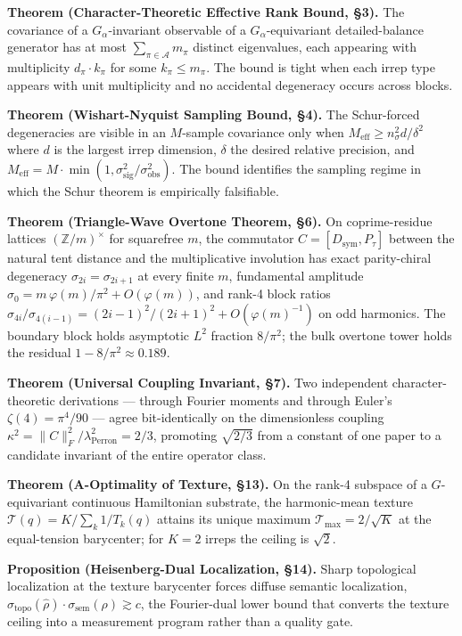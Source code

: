 \documentclass[
  11pt,
]{article}
\begin{document}
\textbf{Theorem (Character-Theoretic Effective Rank Bound, §3).} The
covariance of a \(G_\alpha\)-invariant observable of a
\(G_\alpha\)-equivariant detailed-balance generator has at most
\(\sum_{\pi \in \mathcal{A}} m_\pi\) distinct eigenvalues, each
appearing with multiplicity \(d_\pi \cdot k_\pi\) for some
\(k_\pi \leq m_\pi\). The bound is tight when each irrep type appears
with unit multiplicity and no accidental degeneracy occurs across
blocks.

\textbf{Theorem (Wishart-Nyquist Sampling Bound, §4).} The Schur-forced
degeneracies are visible in an \(M\)-sample covariance only when
\(M_\text{eff} \geq n_\sigma^2 d / \delta^2\) where \(d\) is the largest
irrep dimension, \(\delta\) the desired relative precision, and
\(M_\text{eff} = M \cdot \min(1, \sigma_\text{sig}^2/\sigma_\text{obs}^2)\).
The bound identifies the sampling regime in which the Schur theorem is
empirically falsifiable.

\textbf{Theorem (Triangle-Wave Overtone Theorem, §6).} On
coprime-residue lattices \((\mathbb{Z}/m)^\times\) for squarefree \(m\),
the commutator \(C = [D_\text{sym}, P_\tau]\) between the natural tent
distance and the multiplicative involution has exact parity-chiral
degeneracy \(\sigma_{2i} = \sigma_{2i+1}\) at every finite \(m\),
fundamental amplitude
\(\sigma_0 = m\,\varphi(m)/\pi^2 + O(\varphi(m))\), and rank-4 block
ratios
\(\sigma_{4i}/\sigma_{4(i-1)} = (2i-1)^2/(2i+1)^2 + O(\varphi(m)^{-1})\)
on odd harmonics. The boundary block holds asymptotic \(L^2\) fraction
\(8/\pi^2\); the bulk overtone tower holds the residual
\(1 - 8/\pi^2 \approx 0.189\).

\textbf{Theorem (Universal Coupling Invariant, §7).} Two independent
character-theoretic derivations --- through Fourier moments and through
Euler's \(\zeta(4) = \pi^4/90\) --- agree bit-identically on the
dimensionless coupling
\(\kappa^2 = \|C\|_F^2 / \lambda_\text{Perron}^2 = 2/3\), promoting
\(\sqrt{2/3}\) from a constant of one paper to a candidate invariant of
the entire operator class.

\textbf{Theorem (A-Optimality of Texture, §13).} On the rank-4 subspace
of a \(G\)-equivariant continuous Hamiltonian substrate, the
harmonic-mean texture \(\mathcal{T}(q) = K / \sum_k 1/T_k(q)\) attains
its unique maximum \(\mathcal{T}_\text{max} = 2/\sqrt{K}\) at the
equal-tension barycenter; for \(K = 2\) irreps the ceiling is
\(\sqrt{2}\).

\textbf{Proposition (Heisenberg-Dual Localization, §14).} Sharp
topological localization at the texture barycenter forces diffuse
semantic localization,
\(\sigma_\text{topo}(\hat\rho) \cdot \sigma_\text{sem}(\rho) \gtrsim c\),
the Fourier-dual lower bound that converts the texture ceiling into a
measurement program rather than a quality gate.
\end{document}
